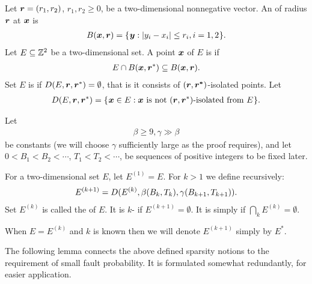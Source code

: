 \documentclass[12pt]{memoir}
\renewcommand{\le}{\leq}
\renewcommand{\ge}{\geq}
\def\B{B}
\newcommand{\Tu}{T}
\begin{document}
\begin{definition}
Let \( \boldsymbol{r}=(r_{1},r_{2}) \), \( r_{1}, r_{2}\ge 0 \),
be a two-dimensional nonnegative vector.
An  of radius \( \boldsymbol{r} \)  at \( \boldsymbol{x} \) is
\begin{align}\label{eq:ball1}
  B(\vek{x},\vek{r}) = \setOf{\vek{y}}{\abs{y_{i} - x_{i}} \le r_{i}, i=1,2}.
\end{align}  
Let \( E\subseteq \mathbb{Z}^{2} \) be a two-dimensional set.
A point \( \boldsymbol{x} \) of \( E \) is  if
\begin{align*}
  E \cap B(\boldsymbol{x},\boldsymbol{r}^{*})\subseteq B(\boldsymbol{x}, \boldsymbol{r}).
 \end{align*}
Set \( E \) is  
if \( D(E, \boldsymbol{r}, \boldsymbol{r}^{*})=\emptyset \), that is 
it consists of \( (\boldsymbol{r}, \boldsymbol{r^{*}}) \)-isolated points.
Let
\begin{align}
  D(E,\boldsymbol{r}, \boldsymbol{r}^{*}) =
     \mathopen\{\mskip 1mu\boldsymbol{x}\in E : \boldsymbol{x} \text{\rmfamily\mdseries\upshape{ is not }} (\boldsymbol{r}, \boldsymbol{r}^{*})\text{\rmfamily\mdseries\upshape{-isolated
  from }} E\mskip 1mu\mathclose\}.
\end{align}
\end{definition}

\begin{definition}[Sparsity]\label{def:sparsity}
Let
\begin{align}\label{eq:beta}
 \beta\ge 9, \gamma\gg\beta
 \end{align}
be constants (we will choose \( \gamma \) sufficiently large as the proof requires), and let 
\( 0<\B_{1}<\B_{2}<\dotsm \), \( \Tu_{1}<\Tu_{2}<\dotsm \), 
be sequences of positive integers to be fixed later.

For a two-dimensional set \( E \), let \( E^{(1)} = E \).
For \( k>1 \) we define recursively:
\begin{align}\label{eq:noise^k}
    E^{(k+1)} = D(E^{(k)}, \beta\pair{\B_{k}}{\Tu_{k}}, \gamma\pair{\B_{k+1}}{\Tu_{k+1}}).
\end{align}
Set \( E^{(k)} \) is called the  of \( E \).
It is \( k \)- if \( E^{(k+1)}=\emptyset \).
It is simply  if \( \bigcap_{k}E^{(k)}=\emptyset \).

When \( E=E^{(k)} \) and \( k \) is known
then we will denote \( E^{(k+1)} \) simply by \( E^{*} \).
\end{definition}

The following lemma connects the above defined sparsity notions to the requirement
of small fault probability.
It is formulated somewhat redundantly, for easier application.
\end{document}

